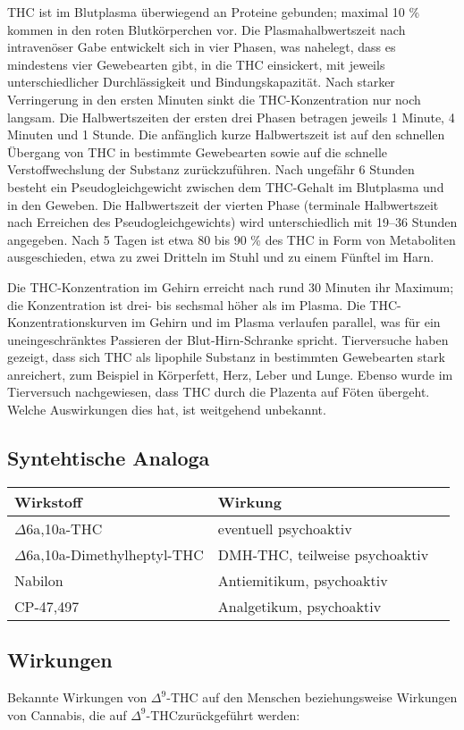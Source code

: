 \documentclass[openany]{scrbook}
\begin{document}
	THC ist im Blutplasma überwiegend an Proteine gebunden; maximal 10 \% kommen in den roten Blutkörperchen vor. Die Plasmahalbwertszeit nach intravenöser Gabe entwickelt sich in vier Phasen, was nahelegt, dass es mindestens vier Gewebearten gibt, in die THC einsickert, mit jeweils unterschiedlicher Durchlässigkeit und Bindungskapazität. Nach starker Verringerung in den ersten Minuten sinkt die THC-Konzentration nur noch langsam. Die Halbwertszeiten der ersten drei Phasen betragen jeweils 1 Minute, 4 Minuten und 1 Stunde. Die anfänglich kurze Halbwertszeit ist auf den schnellen Übergang von THC in bestimmte Gewebearten sowie auf die schnelle Verstoffwechslung der Substanz zurückzuführen. Nach ungefähr 6 Stunden besteht ein Pseudogleichgewicht zwischen dem THC-Gehalt im Blutplasma und in den Geweben. Die Halbwertszeit der vierten Phase (terminale Halbwertszeit nach Erreichen des Pseudogleichgewichts) wird unterschiedlich mit 19–36 Stunden angegeben. Nach 5 Tagen ist etwa 80 bis 90 \% des THC in Form von Metaboliten ausgeschieden, etwa zu zwei Dritteln im Stuhl und zu einem Fünftel im Harn.
	
	Die THC-Konzentration im Gehirn erreicht nach rund 30 Minuten ihr Maximum; die Konzentration ist drei- bis sechsmal höher als im Plasma. Die THC-Konzentrationskurven im Gehirn und im Plasma verlaufen parallel, was für ein uneingeschränktes Passieren der Blut-Hirn-Schranke spricht. Tierversuche haben gezeigt, dass sich THC als lipophile Substanz in bestimmten Gewebearten stark anreichert, zum Beispiel in Körperfett, Herz, Leber und Lunge. Ebenso wurde im Tierversuch nachgewiesen, dass THC durch die Plazenta auf Föten übergeht. Welche Auswirkungen dies hat, ist weitgehend unbekannt.
	
\subsection{Syntehtische Analoga}
	 \begin{tabular}[pos]{l|lr}
	 	\textbf{Wirkstoff}&\textbf{Wirkung}\\ \hline
	 	$\Delta$6a,10a-THC & eventuell psychoaktiv \\
	 	$\Delta$6a,10a-Dimethylheptyl-THC & DMH-THC, teilweise psychoaktiv\\
	 	Nabilon & Antiemitikum, psychoaktiv \\
	 	CP-47,497 & Analgetikum, psychoaktiv
	 \end{tabular}
	 
\subsection{Wirkungen}
	Bekannte Wirkungen von $\Delta^9$-THC auf den Menschen beziehungsweise Wirkungen von Cannabis, die auf $\Delta^9$-THCzurückgeführt werden: \\
	
\end{document}
